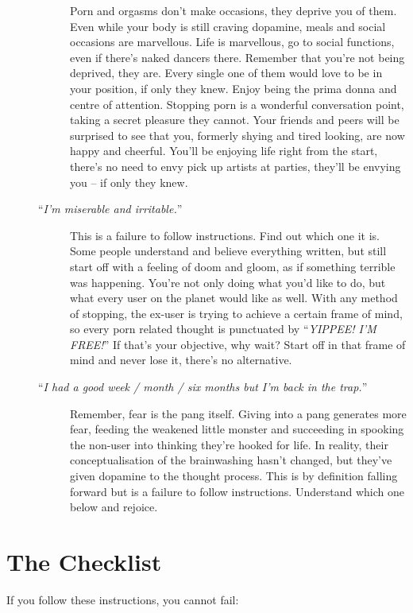 \documentclass[
]{book}
\begin{document}
\begin{description}
\begin{description}
Porn and orgasms don't make occasions, they deprive you of them. Even while your body is still craving dopamine, meals and social occasions are marvellous. Life is marvellous, go to social functions, even if there's naked dancers there. Remember that you're not being deprived, they are. Every single one of them would love to be in your position, if only they knew. Enjoy being the prima donna and centre of attention. Stopping porn is a wonderful conversation point, taking a secret pleasure they cannot. Your friends and peers will be surprised to see that you, formerly shying and tired looking, are now happy and cheerful. You'll be enjoying life right from the start, there's no need to envy pick up artists at parties, they'll be envying you -- if only they knew.
\item[``\emph{I'm miserable and irritable.}'']
This is a failure to follow instructions. Find out which one it is. Some people understand and believe everything written, but still start off with a feeling of doom and gloom, as if something terrible was happening. You're not only doing what you'd like to do, but what every user on the planet would like as well. With any method of stopping, the ex-user is trying to achieve a certain frame of mind, so every porn related thought is punctuated by ``\emph{YIPPEE! I'M FREE!}'' If that's your objective, why wait? Start off in that frame of mind and never lose it, there's no alternative.
\item[``\emph{I had a good week / month / six months but I'm back in the trap.}'']
Remember, fear is the pang itself. Giving into a pang generates more fear, feeding the weakened little monster and succeeding in spooking the non-user into thinking they're hooked for life. In reality, their conceptualisation of the brainwashing hasn't changed, but they've given dopamine to the thought process. This is by definition falling forward but is a failure to follow instructions. Understand which one below and rejoice.
\end{description}
\end{description}

\hypertarget{the-checklist}{%
\section{The Checklist}\label{the-checklist}}

If you follow these instructions, you cannot fail:
\end{document}
